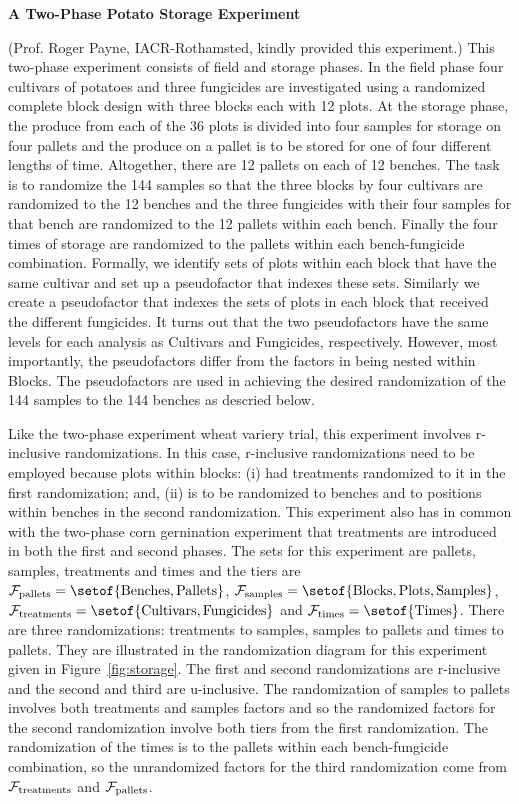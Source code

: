 \begin{flushleft}\Large\bf A Two-Phase Potato Storage Experiment
\end{flushleft}

(Prof. Roger Payne, IACR-Rothamsted, kindly provided this experiment.)
This two-phase experiment consists of field and storage phases. In the
field phase four cultivars of potatoes and three fungicides are
investigated using a randomized complete block design with three blocks
each with 12 plots. At the storage phase, the produce from each of the
36 plots is divided into four samples for storage on four pallets and
the produce on a pallet is to be stored for one of four different
lengths of time.  Altogether, there are  12 pallets on each of 12 benches.
The task is to randomize the 144 samples so that the three blocks by four
cultivars are randomized to the 12 benches and the three fungicides with
their four samples for that bench are randomized to the 12 pallets within
each bench.
Finally the four times of storage are randomized to the pallets within
each bench-fungicide combination.
Formally, we identify sets of plots within each block that have the same
cultivar and set up a pseudofactor that indexes these sets.
Similarly we create a pseudofactor that indexes the sets of plots in each
block that received the different fungicides. It turns out that the two
pseudofactors have the same levels for each analysis as Cultivars and
Fungicides, respectively. However, most importantly, the pseudofactors
differ from the factors in being nested within Blocks. The pseudofactors
are used in achieving the desired randomization of the 144 samples to the
144 benches as descried below.

Like the two-phase experiment wheat variery trial, this experiment
involves r-inclusive randomizations. In this case, r-inclusive
randomizations need to be employed because plots within blocks:
(i) had treatments randomized to it in the first randomization; and,
(ii) is to be randomized to benches and to positions within benches
in the second randomization. This experiment also has in common with
the two-phase corn gernination experiment that treatments are
introduced in both the first and second phases.  The sets for this experiment
are pallets, samples, treatments and times and the tiers are
${\cal F}_{\rm pallets} = \setof{\mbox{Benches}, \mbox{Pallets}}$,
${\cal F}_{\rm samples} = \setof{\mbox{Blocks}, \mbox{Plots},
\mbox{Samples}}$,
${\cal F}_{\rm treatments} = \setof{\mbox{Cultivars}, \mbox{Fungicides}}$
and ${\cal F}_{\rm times} = \setof{\mbox{Times}}$.
There are three randomizations: treatments to samples, samples to
pallets and times to pallets. They are illustrated in the randomization
diagram for this experiment given in Figure~\ref{fig:storage}.
The first and second randomizations are r-inclusive and
the second and third are u-inclusive. The randomization of samples
to pallets involves both treatments and samples factors and so the randomized
factors for the second randomization involve both tiers from the first
randomization. The randomization of the times is to the
pallets within each bench-fungicide combination, so the unrandomized
factors for the third randomization come from ${\cal F}_{\rm
treatments}$ and ${\cal F}_{\rm pallets}$.

